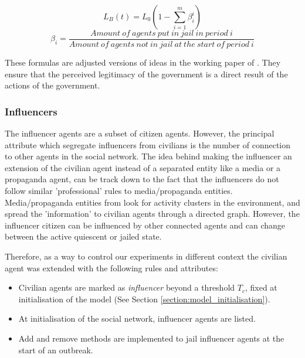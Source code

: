 \documentclass[10pt]{article}
\begin{document}
    \begin{equation}
        L_B(t) = L_0(1- \sum\limits_{i = 1}^{m} \beta^i_i)
    \end{equation}
    \begin{equation}
        \beta_i = \frac{Amount\ of\ agents\ put\ in\ jail\ in\ period\ i}{Amount\ of\ agents\ not\ in\ jail\ at\ the\ start\ of\ period\ i}
    \end{equation}

    These formulas are adjusted versions of ideas in the working paper of \cite{epstein2001modeling}. They ensure that the perceived legitimacy of the government is a direct result of the actions of the government.


    \subsubsection{Influencers}
    \label{section:influencer_entity}

    The influencer agents are a subset of citizen agents. However, the principal attribute which segregate influencers from civilians is the number of connection to other agents in the social network. The idea behind making the influencer an extension of the civilian agent instead of a separated entity like a media or a propaganda agent, can be track down to the fact that the influencers do not follow similar 'professional' rules to media/propaganda entities. Media/propaganda entities from \citet{lemos2015} look for activity clusters in the environment, and spread the 'information' to civilian agents through a directed graph. However, the influencer citizen can be influenced by other connected agents and can change between the active quiescent or jailed state.

    Therefore, as a way to control our experiments in different context the civilian agent was extended with the following rules and attributes:
    \begin{itemize}
        \item Civilian agents are marked as \emph{influencer} beyond a threshold $T_c$, fixed at initialisation of the model (See Section \ref{section:model_initialisation}).
        \item At initialisation of the social network, influencer agents are listed.
        \item Add and remove methods are implemented to jail influencer agents at the start of an outbreak.
    \end{itemize}
\end{document}
